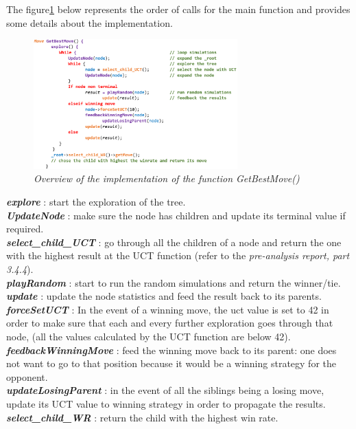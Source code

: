 The figure\ref{fig:MCTSAlgorithm} below represents the order of calls for the main function and provides some details about the implementation.
\begin{figure}[H]
\centerline{\includegraphics[width=0.7\textwidth]{Base_Algorithm/Img/Algorithm.png}}
\caption{\label{fig:MCTSAlgorithm}\textit{Overview of the implementation of the function GetBestMove()}}
\end{figure}
\noindent
\textit{\textbf{explore}} : start the exploration of the tree.
\medskip\\
\textit{\textbf{UpdateNode}} : make sure the node has children and update its terminal value if required.
\medskip\\
\textit{\textbf{select\_child\_UCT}} : go through all the children of a node and return the one with the highest result at the UCT function (refer to the \textit{pre-analysis report, part 3.4.4}).
\medskip\\
\textit{\textbf{playRandom}} : start to run the random simulations and return the winner/tie.
\medskip\\
\textit{\textbf{update}} : update the node statistics and feed the result back to its parents.
\medskip\\
\textit{\textbf{forceSetUCT}} : In the event of a winning move, the uct value is set to 42 in order to make sure that each and every further exploration goes through that node, (all the values calculated by the UCT function are below 42).
\medskip\\
\textit{\textbf{feedbackWinningMove}} : feed the winning move back to its parent: one does not want to go to that position because it would be a winning strategy for the opponent.
\medskip\\
\textit{\textbf{updateLosingParent}} : in the event of all the siblings being a losing move, update its UCT value to winning strategy in order to propagate the results.
\medskip\\
\textit{\textbf{select\_child\_WR}} : return the child with the highest win rate.\\
